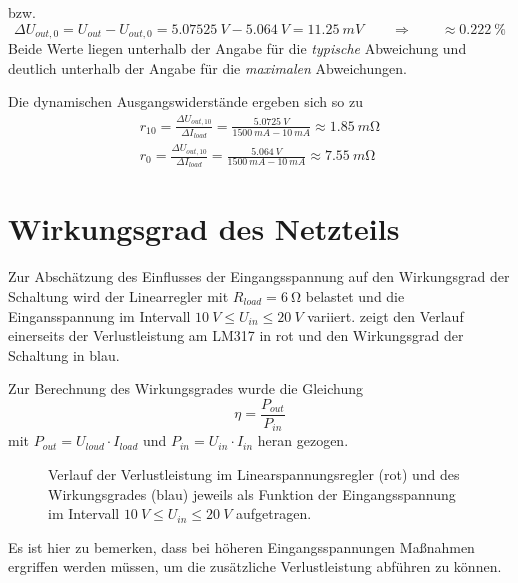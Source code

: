 		bzw.
		\begin{equation}
			\Delta U_{out,0} = U_{out} - U_{out,0} = \SI{5,07525}{V} - \SI{5,064}{V} = \SI{11,25}{mV} \qquad \Rightarrow \qquad \approx \SI{0,222}{\percent}
		\end{equation}
		Beide Werte liegen unterhalb der Angabe für die \textit{typische} Abweichung und deutlich unterhalb der Angabe für die \textit{maximalen} Abweichungen.\par\medskip
		Die dynamischen Ausgangswiderstände ergeben sich so zu
		\begin{align}
			r_{10} = \frac{\Delta U_{out,10}}{\Delta I_{load}} = \frac{\SI{5,0725}{V}}{\SI{1500}{mA} - \SI{10}{mA}} \approx \SI{1,85}{m\ohm} \nonumber \\
			r_{0} = \frac{\Delta U_{out,10}}{\Delta I_{load}} = \frac{\SI{5,064}{V}}{\SI{1500}{mA} - \SI{10}{mA}} \approx \SI{7,55}{m\ohm}
		\end{align}
	\newpage
	\section{Wirkungsgrad des Netzteils}
		Zur Abschätzung des Einflusses der Eingangsspannung auf den Wirkungsgrad der Schaltung wird der Linearregler mit \(R_{load} = \SI{6}{\ohm}\) belastet und
		die Eingansspannung im Intervall \(\SI{10}{V} \leq U_{in} \leq \SI{20}{V}\) variiert.  zeigt den Verlauf einerseits der Verlustleistung
		am LM317 in rot und den Wirkungsgrad der Schaltung in blau.\par
		Zur Berechnung des Wirkungsgrades wurde die Gleichung
		\begin{equation}
			\eta = \frac{P_{out}}{P_{in}}
		\end{equation}
		mit \(P_{out} = U_{loud} \cdot I_{load}\) und \(P_{in} = U_{in} \cdot I_{in}\) heran gezogen.
		\begin{figure}[h]
			\centering
			
			\caption[Verlauf der Verlustleistung und des Wirkungsgrades jeweils als Funktion der Eingangsspannung]{Verlauf der Verlustleistung im Linearspannungsregler (rot) und des
			Wirkungsgrades (blau) jeweils als Funktion der Eingangsspannung im Intervall \(\SI{10}{V} \leq U_{in} \leq \SI{20}{V}\) aufgetragen.}
			\label{fig:efficiency}
		\end{figure}
		Es ist hier zu bemerken, dass bei höheren Eingangsspannungen Maßnahmen ergriffen werden müssen, um die zusätzliche Verlustleistung abführen zu können.